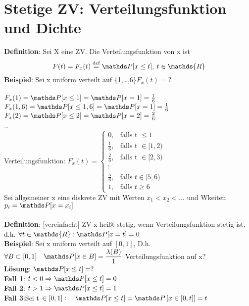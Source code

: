 \chapter{Stetige ZV: Verteilungsfunktion und Dichte}
\textbf{Definition}: Sei X eine ZV. Die Verteilungsfunktion von x ist 
$$F(t) = F_x(t)\overset{\text{def}}{=} \PP [x \leq t],\: t\in \mathds{R}$$
\textbf{Beispiel}: Sei x uniform verteilt auf \{1,\dots,6\}\hspace{1cm}$F_x(t)=?$\smallskip\\
\smallskip\\
$F_x(1)=\PP[x\leq 1]=\PP[x=1] = \frac{1}{6}$\smallskip\\
$F_x(1,6) = \PP[x\leq 1,6] = \PP [x=1] = \frac{1}{6}$\smallskip\\
$F_x(2)= \PP[x\leq 2] = \PP[x=2] = \frac{2}{6}$\smallskip\\
\dots\medskip\\
Verteilungsfunktion: $F_x(t) = \begin{cases}
0, &\text{falls t }\leq 1\\
\frac{1}{6}, & \text{falls t }\in [1,2)\\
\frac{2}{6}, & \text{falls t }\in [2,3)\\
\vdots\\
\frac{5}{6}, & \text{falls } t \in [5,6)\\
1,& \text{falls }t \geq 6
\end{cases}$\medskip\\
Sei allgemeiner x eine diskrete ZV mit Werten $x_1 < x_2 < \dots$ und Wkeiten $p_i = \PP [x = x_i]$\smallskip\\
\smallskip\\
\textbf{Definition}: $[$vereinfacht$]$ ZV x heißt stetig, wenn Verteilungsfunktion stetig ist, d.h. $\forall t \in \mathds{R}:\PP[x=t]=0$\medskip\\
\textbf{Beispiel}: Sei x uniform verteilt auf $[0,1]$, D.h. $\forall B \subset [0,1] \quad \PP[x \in B] = \dfrac{\lambda(B)}{1}$ Verteilungsfunktion auf x?\medskip\\
\textbf{Lösung}: $\PP[x\leq t] = ?$\\
\textbf{Fall 1}: $t < 0 \Rightarrow \PP [x \leq t ] = 0$\smallskip\\
\textbf{Fall 2}: $t > 1 \Rightarrow \PP [x \leq t] = 1$\smallskip\\
\textbf{Fall 3}:Sei t $\in  [0,1]: \quad \PP[x\leq t] = \PP\left[x \in \left[0,t\right] \right] = t$\medskip\\
